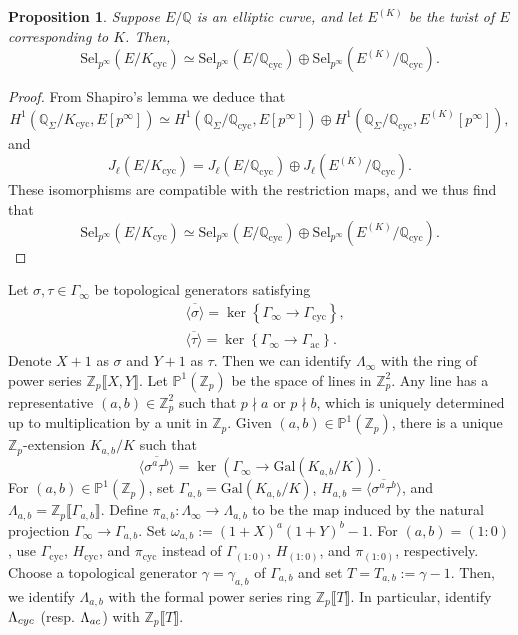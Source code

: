 \documentclass[12pt]{amsart}
\newtheorem{proposition}[theorem]{Proposition}
\newcommand{\Z}{\mathbb{Z}}
\newcommand{\Q}{\mathbb{Q}}
\newcommand{\op}[1]{\operatorname{#1}}
\numberwithin{equation}{section}
\begin{document}
\begin{proposition}\label{prop:selmer-decomposition-ord}
    Suppose $ E/\mathbb{Q} $ is an elliptic curve, and let $ E^{(K)} $ be the twist of $ E $ corresponding to $ K $. Then,
    \[
    \mathrm{Sel}_{p^\infty}(E/K_{\mathrm{cyc}}) \simeq \mathrm{Sel}_{p^\infty}(E/\mathbb{Q}_{\mathrm{cyc}}) \oplus \mathrm{Sel}_{p^\infty}(E^{(K)}/\mathbb{Q}_{\mathrm{cyc}}).
    \]
\end{proposition}
\begin{proof}
    From Shapiro's lemma we deduce that 
    \[H^1(\Q_\Sigma/K_{\op{cyc}}, E[p^\infty])\simeq H^1(\Q_\Sigma/\Q_{\op{cyc}}, E[p^\infty])\oplus H^1(\Q_\Sigma/\Q_{\op{cyc}}, E^{(K)}[p^\infty]),\] and 
    \[J_\ell(E/K_{\op{cyc}})=J_\ell(E/\Q_{\op{cyc}})\oplus J_\ell(E^{(K)}/\Q_{\op{cyc}}).\]
    These isomorphisms are compatible with the restriction maps, and we thus find that 
    \[
    \mathrm{Sel}_{p^\infty}(E/K_{\mathrm{cyc}}) \simeq \mathrm{Sel}_{p^\infty}(E/\mathbb{Q}_{\mathrm{cyc}}) \oplus \mathrm{Sel}_{p^\infty}(E^{(K)}/\mathbb{Q}_{\mathrm{cyc}}).
    \]
\end{proof}

Let $ \sigma, \tau \in \Gamma_\infty $ be topological generators satisfying
\[
\begin{split}
    &\overline{\langle \sigma \rangle} = \ker\left\{\Gamma_\infty \longrightarrow \Gamma_{\mathrm{cyc}}\right\},\\
    & \overline{\langle \tau \rangle} = \ker\left\{\Gamma_\infty \longrightarrow  \Gamma_{\mathrm{ac}}\right\}.
\end{split}
\]
Denote $ X+1 $ as $ \sigma $ and $ Y+1 $ as $ \tau $. Then we can identify $ \Lambda_\infty$ with the ring of power series $\mathbb{Z}_p\llbracket X,Y\rrbracket $. Let $\mathbb{P}^1(\mathbb{Z}_p)$ be the space of lines in $\mathbb{Z}_p^2$. Any line has a representative $ (a,b) \in \mathbb{Z}_p^2 $ such that $ p \nmid a $ or $ p \nmid b $, which is uniquely determined up to multiplication by a unit in $\Z_p$. Given $ (a,b) \in \mathbb{P}^1(\mathbb{Z}_p) $, there is a unique $\mathbb{Z}_p$-extension $ K_{a,b}/K $ such that
\[
\overline{\langle \sigma^a \tau^b \rangle} = \ker\left(\Gamma_\infty \rightarrow \mathrm{Gal}(K_{a,b}/K)\right).
\]
For $ (a,b) \in \mathbb{P}^1(\mathbb{Z}_p) $, set $\Gamma_{a,b} = \mathrm{Gal}(K_{a,b}/K)$, $ H_{a,b} = \overline{\langle \sigma^a \tau^b \rangle} $, and $\Lambda_{a,b} = \mathbb{Z}_p\llbracket \Gamma_{a,b} \rrbracket $. Define $\pi_{a,b} : \Lambda_\infty \rightarrow \Lambda_{a,b}$ to be the map induced by the natural projection $ \Gamma_\infty \rightarrow \Gamma_{a,b} $. Set $\omega_{a,b}:= (1+X)^a(1+Y)^b - 1 $. For $(a,b) = (1:0)$, use $\Gamma_{\mathrm{cyc}}$, $ H_{\mathrm{cyc}}$, and $\pi_{\mathrm{cyc}}$ instead of $\Gamma_{(1:0)}$, $ H_{(1:0)}$, and $\pi_{(1:0)}$, respectively. Choose a topological generator $\gamma=\gamma_{a,b}$ of $\Gamma_{a,b}$ and set $T=T_{a,b}:=\gamma-1$. Then, we identify $\Lambda_{a,b}$ with the formal power series ring $\Z_p\llbracket T\rrbracket$. In particular, identify $\Lambda_{\rm{cyc}}$ (resp. $\Lambda_{\rm{ac}}$) with $\Z_p\llbracket T\rrbracket$.
\end{document}
